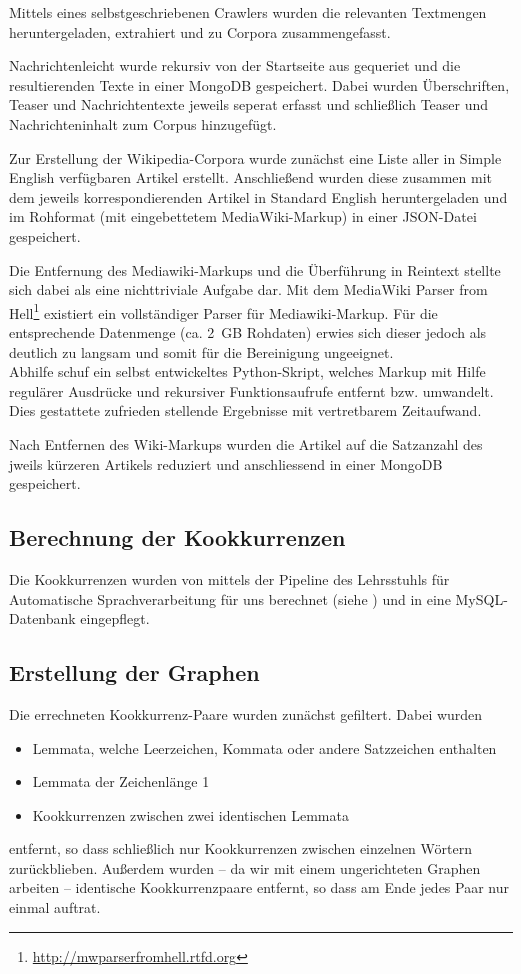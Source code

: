 \documentclass[11pt, a4paper]{article}
\begin{document}
Mittels eines selbstgeschriebenen Crawlers wurden die relevanten Textmengen
heruntergeladen, extrahiert und zu Corpora zusammengefasst.

Nachrichtenleicht wurde rekursiv von der Startseite aus gequeriet
und die resultierenden Texte in einer MongoDB gespeichert.
Dabei wurden Überschriften, Teaser und Nachrichtentexte jeweils seperat erfasst
und schließlich Teaser und Nachrichteninhalt zum Corpus hinzugefügt.

Zur Erstellung der Wikipedia-Corpora wurde zunächst eine Liste aller
in Simple English verfügbaren Artikel erstellt. Anschließend wurden diese
zusammen mit dem jeweils korrespondierenden Artikel in Standard English
heruntergeladen und im Rohformat (mit eingebettetem MediaWiki-Markup) in einer
JSON-Datei gespeichert.

Die Entfernung des Mediawiki-Markups und die Überführung in Reintext stellte
sich dabei als eine nichttriviale Aufgabe dar.
Mit dem MediaWiki Parser from
Hell\footnote{\url{http://mwparserfromhell.rtfd.org}} existiert ein vollständiger
Parser für Mediawiki-Markup.
Für die entsprechende Datenmenge (ca. 2~GB Rohdaten) erwies sich dieser jedoch
als deutlich zu langsam und somit für die Bereinigung ungeeignet.
\\
Abhilfe schuf ein selbst entwickeltes Python-Skript, welches Markup mit Hilfe
regul\"arer Ausdr\"ucke und rekursiver Funktionsaufrufe entfernt bzw. umwandelt.
Dies gestattete zufrieden stellende Ergebnisse mit vertretbarem Zeitaufwand.

Nach Entfernen des Wiki-Markups wurden die Artikel auf die Satzanzahl
des jweils k\"urzeren Artikels reduziert und anschliessend in einer MongoDB
gespeichert.


\subsection{Berechnung der Kookkurrenzen}

Die Kookkurrenzen wurden von mittels der Pipeline des Lehrsstuhls f\"ur
Automatische Sprachverarbeitung für uns berechnet (siehe \cite{Quasthoff2006})
und in eine MySQL-Datenbank eingepflegt.


\subsection{Erstellung der Graphen}

Die errechneten Kookkurrenz-Paare wurden zunächst gefiltert. Dabei wurden 
\begin{itemize}
    \item Lemmata, welche Leerzeichen, Kommata oder andere Satzzeichen enthalten
    \item Lemmata der Zeichenlänge 1
    \item Kookkurrenzen zwischen zwei identischen Lemmata
\end{itemize}
entfernt, so dass schließlich nur Kookkurrenzen zwischen einzelnen Wörtern
zurückblieben.
Außerdem wurden -- da wir mit einem ungerichteten Graphen arbeiten -- identische
Kookkurrenzpaare entfernt, so dass am Ende jedes Paar nur einmal auftrat.
\end{document}
